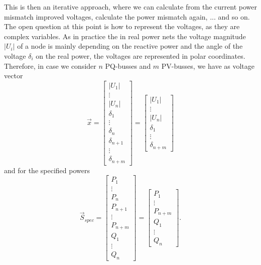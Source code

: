 This is then an iterative approach, where we can calculate from the current power mismatch improved voltages, calculate the power mismatch again, ... and so on. The open question at this point is how to represent the voltages, as they are complex variables. As in practice the in real power nets the voltage magnitude $|U_i|$ of a node is mainly depending on the reactive power and the angle of the voltage $\delta_i$ on the real power, the voltages are represented in polar coordinates. Therefore, in case we consider $n$ PQ-busses and $m$ PV-busses, we have as voltage vector 
\begin{equation}
	\vec x = 
	\begin{bmatrix}
		|U_1| \\
		\vdots \\
		|U_n| \\
		\delta_1 \\
		\vdots \\
		\delta_n \\
		\delta_{n + 1} \\
		\vdots \\
		\delta_{n + m} 
	\end{bmatrix} = 	
	\begin{bmatrix}
		|U_1| \\
		\vdots \\
		|U_n| \\
		\delta_1 \\
		\vdots \\
		\delta_{n + m} 
	\end{bmatrix}
\end{equation}
and for the specified powers
\begin{equation}
	\vec S_{spec} = 
	\begin{bmatrix}
		P_1 \\
		\vdots \\
		P_n \\
		P_{n + 1} \\
		\vdots \\
		P_{n + m} \\
		Q_1 \\
		\vdots \\
		Q_n
	\end{bmatrix} = 
	\begin{bmatrix}
		P_1 \\
		\vdots \\
		P_{n + m} \\
		Q_1 \\
		\vdots \\
		Q_n
	\end{bmatrix}.
\end{equation}

